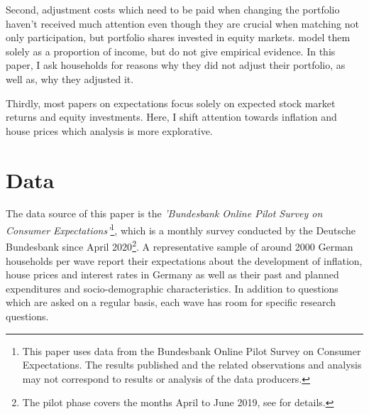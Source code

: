 \documentclass[ProjectABM]{subfiles}
\begin{document}
Second, adjustment costs which need to be paid when changing the portfolio haven't received much attention even though they are crucial when matching not only participation, but portfolio shares invested in equity markets. \cite{bonaparte_et_al_2012adjustment} model them solely as a proportion of income, but do not give empirical evidence. In this paper, I ask households for reasons why they did not adjust their portfolio, as well as, why they adjusted it.

Thirdly, most papers on expectations focus solely on expected stock market returns and equity investments. Here, I shift attention towards inflation and house prices which analysis is more explorative. %



\section{Data}\label{sec:data}

The data source of this paper is the \textit{'Bundesbank Online Pilot Survey on Consumer Expectations'}\footnote{This paper uses data from the Bundesbank Online Pilot Survey on Consumer Expectations. The results published and the related observations and analysis may not correspond to results or analysis of the data producers.}, which is a monthly survey conducted by the Deutsche Bundesbank since April 2020\footnote{The pilot phase covers the months April to June 2019, see \cite{bundesbank_2020} for details.}. A representative sample of around 2000 German households per wave report their expectations about the development of inflation, house prices and interest rates in Germany as well as their past and planned expenditures and socio-demographic characteristics. In addition to questions which are asked on a regular basis, each wave has room for specific research questions.
\end{document}
